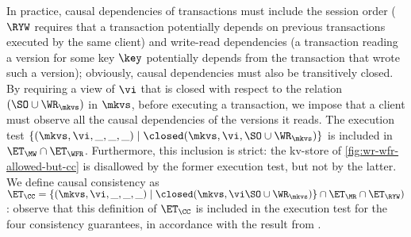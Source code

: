 In practice, causal dependencies of transactions must include the session order ($\RYW$ requires that 
a transaction potentially depends on previous transactions executed by the same client) and 
write-read dependencies (a transaction reading a version for some key $\key$ potentially depends from the transaction 
that wrote such a version); obviously, causal dependencies must also be transitively closed. 
By requiring a view of $\vi$ that is closed with respect to the relation $(\SO \cup \WR_{\mkvs})$ in $\mkvs$, 
before executing a transaction, we impose that a client must observe all the causal dependencies of the 
versions it reads. The execution test $\{(\mkvs, \vi, \_, \_, \_) \mid \closed(\mkvs, \vi, \SO \cup \WR_{\mkvs})\}$ is
included in $\ET_{\MW} \cap \ET_{\WFR}$. Furthermore, this inclusion is strict: the kv-store of 
\cref{fig:wr-wfr-allowed-but-cc} is disallowed by the former execution test, but not by the latter. 
We define causal consistency as $\ET_{\CC} = \{(\mkvs, \vi, \_, \_, \_) \mid \closed(\mkvs, \vi \SO \cup \WR_{\mkvs})\} 
\cap \ET_{\MR} \cap \ET_{\RYW})$: observe that this definition of $\ET_{\CC}$ is included in the execution 
test for the four consistency guarantees, in accordance with the result from .
%
